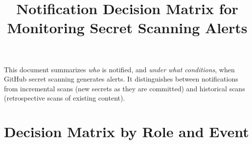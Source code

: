 \documentclass{article}
\begin{document}
\title{Notification Decision Matrix for Monitoring Secret Scanning Alerts}
\author{}
\date{}
\maketitle

This document summarizes \emph{who} is notified, and \emph{under what conditions}, when GitHub
secret scanning generates alerts. It distinguishes between notifications from
incremental scans (new secrets as they are committed) and historical scans
(retrospective scans of existing content).

\section*{Decision Matrix by Role and Event}
\end{document}
